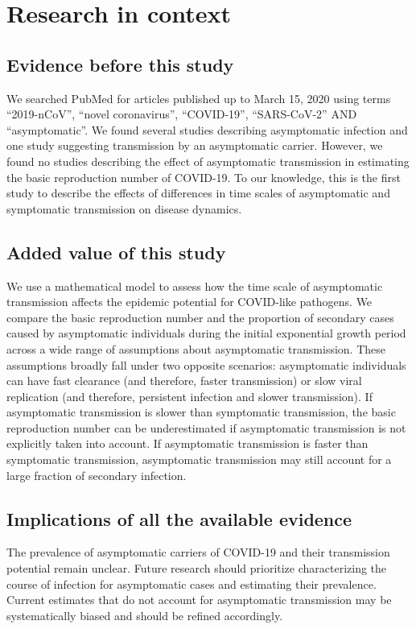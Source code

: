 \section*{Research in context}

\subsection*{Evidence before this study}

We searched PubMed for articles published up to March 15, 2020 using terms ``2019-nCoV'', ``novel coronavirus'', ``COVID-19'', ``SARS-CoV-2'' AND ``asymptomatic''. We found several studies describing asymptomatic infection and one study suggesting transmission by an asymptomatic carrier. 
However, we found no studies describing the effect of asymptomatic transmission in estimating the basic reproduction number of COVID-19. 
To our knowledge, this is the first study to describe the effects of differences in time scales of asymptomatic and symptomatic transmission on disease dynamics.

\subsection*{Added value of this study}

We use a mathematical model to assess how the time scale of asymptomatic transmission affects the epidemic potential for COVID-like pathogens.
We compare the basic reproduction number and the proportion of secondary cases caused by asymptomatic individuals during the initial exponential growth period across a wide range of assumptions about asymptomatic transmission.
These assumptions broadly fall under two opposite scenarios: asymptomatic individuals can have fast clearance (and therefore, faster transmission) or slow viral replication (and therefore, persistent infection and slower transmission).
If asymptomatic transmission is slower than symptomatic transmission, the basic reproduction number can be underestimated if asymptomatic transmission is not explicitly taken into account.
If asymptomatic transmission is faster than symptomatic transmission, asymptomatic transmission may still account for a large fraction of secondary infection.

\subsection*{Implications of all the available evidence}

The prevalence of asymptomatic carriers of COVID-19 and their transmission potential remain unclear. 
Future research should prioritize characterizing the course of infection for asymptomatic cases and estimating their prevalence.
Current estimates that do not account for asymptomatic transmission may be systematically biased and should be refined accordingly.
